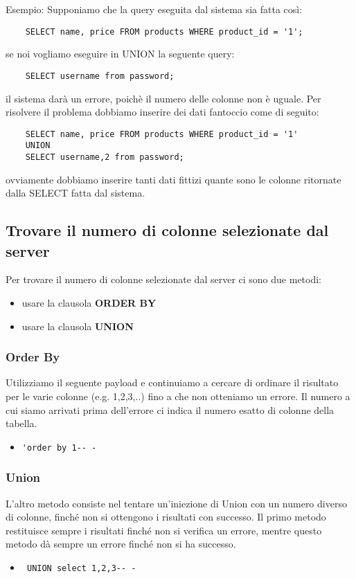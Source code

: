 \documentclass[oneside,a4paper,11pt]{book}
\theoremstyle{italicstyle}
\theoremstyle{normStyle}
\begin{document}
Esempio: Supponiamo che la query eseguita dal sistema sia fatta così:
\begin{verbatim}
    SELECT name, price FROM products WHERE product_id = '1';
\end{verbatim}
se noi vogliamo eseguire in UNION la seguente query:
\begin{verbatim}
    SELECT username from password;
\end{verbatim}
il sistema darà un errore, poichè il numero delle colonne non è uguale. Per risolvere il problema dobbiamo inserire dei dati fantoccio come di seguito:
\begin{verbatim}
    SELECT name, price FROM products WHERE product_id = '1' 
    UNION
    SELECT username,2 from password;
\end{verbatim}
ovviamente dobbiamo inserire tanti dati fittizi quante sono le colonne ritornate dalla SELECT fatta dal sistema.

\subsection{Trovare il numero di colonne selezionate dal server}
Per trovare il numero di colonne selezionate dal server ci sono due metodi:
\begin{itemize}
    \item usare la clausola \textbf{ORDER BY}
    \item usare la clausola \textbf{UNION}
\end{itemize}

\subsubsection{Order By}
Utilizziamo il seguente payload e continuiamo a cercare di ordinare il risultato per le varie colonne (e.g. 1,2,3,..) fino a che non otteniamo un errore. Il numero a cui siamo arrivati prima dell'errore ci indica il numero esatto di colonne della tabella.
\begin{itemize}
    \item \begin{verbatim}'order by 1-- -\end{verbatim}
\end{itemize}

\subsubsection{Union}
L'altro metodo consiste nel tentare un'iniezione di Union con un numero diverso di colonne, finché non si ottengono i risultati con successo. Il primo metodo restituisce sempre i risultati finché non si verifica un errore, mentre questo metodo dà sempre un errore finché non si ha successo.
\begin{itemize}
    \item \begin{verbatim} UNION select 1,2,3-- -\end{verbatim}
\end{itemize}
\end{document}
